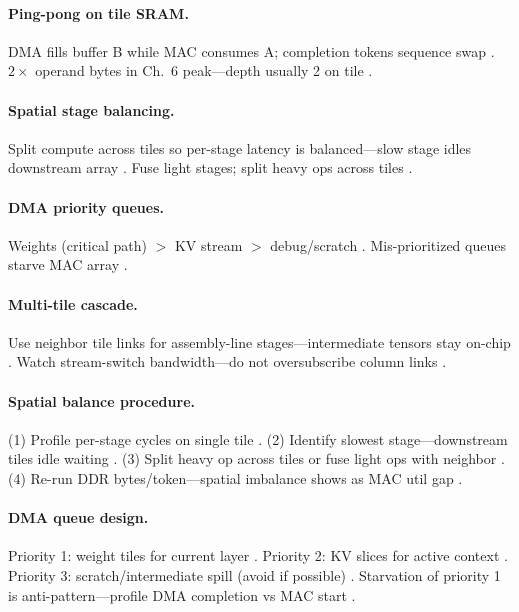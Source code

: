 \paragraph{Ping-pong on tile SRAM.}
DMA fills buffer B while MAC consumes A; completion tokens sequence swap \citep{amd2024aie,amd2024xdna,dao2022flashattention}.
$2\times$ operand bytes in Ch.~6 peak---depth usually 2 on tile \citep{yirage2026,memoryfloor2026}.

\paragraph{Spatial stage balancing.}
Split compute across tiles so per-stage latency is balanced---slow stage idles downstream array \citep{amd2024xdna,patel2025llminference}.
Fuse light stages; split heavy ops across tiles \citep{amd2024aie,chen2020compilerbasedhardw}.

\paragraph{DMA priority queues.}
Weights (critical path) $>$ KV stream $>$ debug/scratch \citep{amd2024xdna,dao2023flashdecoding,shah2024flashattention3}.
Mis-prioritized queues starve MAC array \citep{yirage2026,patel2025llminference}.

\paragraph{Multi-tile cascade.}
Use neighbor tile links for assembly-line stages---intermediate tensors stay on-chip \citep{amd2024aie,amd2024xdna,dao2022flashattention}.
Watch stream-switch bandwidth---do not oversubscribe column links \citep{patel2025llminference,memoryfloor2026,taxbreak2026}.

\paragraph{Spatial balance procedure.}
(1) Profile per-stage cycles on single tile \citep{amd2024xdna,patel2025llminference}.
(2) Identify slowest stage---downstream tiles idle waiting \citep{amd2024aie,yirage2026}.
(3) Split heavy op across tiles or fuse light ops with neighbor \citep{chen2020compilerbasedhardw}.
(4) Re-run DDR bytes/token---spatial imbalance shows as MAC util gap \citep{memoryfloor2026,taxbreak2026}.

\paragraph{DMA queue design.}
Priority 1: weight tiles for current layer \citep{taxbreak2026,amd2024xdna}.
Priority 2: KV slices for active context \citep{kwon2023vllm,dao2023flashdecoding}.
Priority 3: scratch/intermediate spill (avoid if possible) \citep{yirage2026,patel2025llminference}.
Starvation of priority 1 is anti-pattern---profile DMA completion vs MAC start \citep{amd2024aie,shah2024flashattention3}.

